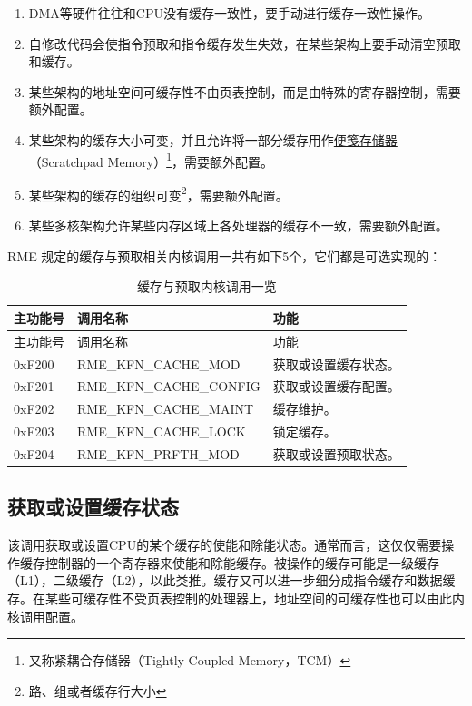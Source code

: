 \begin{enumerate}
\def\labelenumi{\arabic{enumi}.}
\item
  DMA等硬件往往和CPU没有缓存一致性，要手动进行缓存一致性操作。
\item
  自修改代码会使指令预取和指令缓存发生失效，在某些架构上要手动清空预取和缓存。
\item
  某些架构的地址空间可缓存性不由页表控制，而是由特殊的寄存器控制，需要额外配置。
\item
  某些架构的缓存大小可变，并且允许将一部分缓存用作\href{https://blog.csdn.net/dark5669/article/details/56013548}{便笺存储器}（Scratchpad
  Memory）\footnote{又称紧耦合存储器（Tightly Coupled Memory，TCM）}，需要额外配置。
\item
  某些架构的缓存的组织可变\footnote{路、组或者缓存行大小}，需要额外配置。
\item
  某些多核架构允许某些内存区域上各处理器的缓存不一致，需要额外配置。
\end{enumerate}

RME 规定的缓存与预取相关内核调用一共有如下5个，它们都是可选实现的：

\begin{xltabular}{\textwidth}{@{}>{\hsize\raggedright\arraybackslash}X>{\hsize\raggedright\arraybackslash}X>{\hsize\raggedright\arraybackslash}X@{}}
\caption{缓存与预取内核调用一览}\label{tab:8-24-cache-and-prefetch-kernel-calls}\\
\toprule
主功能号 & 调用名称 & 功能\tabularnewline
\endfirsthead
\toprule
主功能号 & 调用名称 & 功能\tabularnewline
\midrule
\endhead
\bottomrule
\endlastfoot
0xF200 & RME\_KFN\_CACHE\_MOD & 获取或设置缓存状态。\tabularnewline
0xF201 & RME\_KFN\_CACHE\_CONFIG & 获取或设置缓存配置。\tabularnewline
0xF202 & RME\_KFN\_CACHE\_MAINT & 缓存维护。\tabularnewline
0xF203 & RME\_KFN\_CACHE\_LOCK & 锁定缓存。\tabularnewline
0xF204 & RME\_KFN\_PRFTH\_MOD & 获取或设置预取状态。\tabularnewline
\end{xltabular}

\subsection{获取或设置缓存状态}\label{subsec:8-get-or-set-cache-state}

该调用获取或设置CPU的某个缓存的使能和除能状态。通常而言，这仅仅需要操作缓存控制器的一个寄存器来使能和除能缓存。被操作的缓存可能是一级缓存（L1），二级缓存（L2），以此类推。缓存又可以进一步细分成指令缓存和数据缓存。在某些可缓存性不受页表控制的处理器上，地址空间的可缓存性也可以由此内核调用配置。

